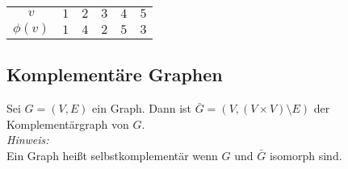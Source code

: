 \begin{tabular}{c|c|c|c|c|c}
$v$ & $1$ & $2$ & $3$ & $4$ & $5$ \\ 
$\phi (v)$ & $1$ & $4$ & $2$ & $5$ & $3$ \\
\end{tabular}
\subsection*{Komplementäre Graphen}
Sei $G=(V,E)$ ein Graph. Dann ist $\bar{G}=(V,(V\times V)\setminus E)$ der Komplementärgraph von $G$.\\
\emph{Hinweis:}\\
Ein Graph heißt selbstkomplementär wenn $G$ und $\bar{G}$ isomorph sind.
\break



\\
